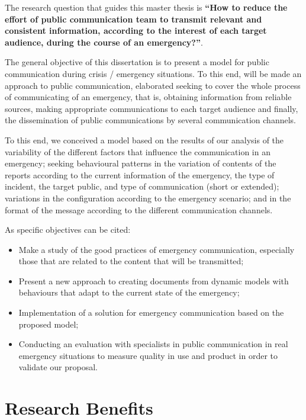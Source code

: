The research question that guides this master thesis is \textbf{“How to reduce the effort of public communication team to transmit relevant and consistent information, according to the interest of each target audience, during the course of an emergency?”}.

The general objective of this dissertation is to present a model for public communication during crisis / emergency situations. To this end, will be made an approach to public communication, elaborated seeking to cover the whole process of communicating of an emergency, that is, obtaining information from reliable sources, making appropriate communications to each target audience and finally, the dissemination of public communications by several communication channels.

To this end, we conceived a model based on the results of our analysis of the variability of the different factors that influence the communication in an emergency; seeking behavioural patterns in the variation of contents of the reports according to the current information of the emergency, the type of incident, the target public, and type of communication (short or extended); variations in the configuration according to the emergency scenario; and in the format of the message according to the different communication channels.

As specific objectives can be cited:

 \begin{itemize}
   \item Make a study of the good practices of emergency communication, especially those that are related to the content that will be transmitted;
   \item Present a new approach to creating documents from dynamic models with behaviours that adapt to the current state of the emergency;
   \item Implementation of a solution for emergency communication based on the proposed model;
   \item Conducting an evaluation with specialists in public communication in real emergency situations to measure quality in use and product in order to validate our proposal.
 \end{itemize}


\section{Research Benefits}


